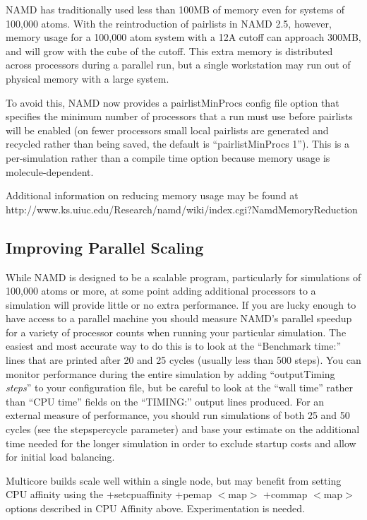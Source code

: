 NAMD has traditionally used less than 100MB of memory even for systems
of 100,000 atoms.  With the reintroduction of pairlists in NAMD 2.5,
however, memory usage for a 100,000 atom system with a 12A cutoff can
approach 300MB, and will grow with the cube of the cutoff.  This extra
memory is distributed across processors during a parallel run, but a
single workstation may run out of physical memory with a large system.

To avoid this, NAMD now provides a pairlistMinProcs config file option
that specifies the minimum number of processors that a run must use
before pairlists will be enabled (on fewer processors small local
pairlists are generated and recycled rather than being saved, the
default is ``pairlistMinProcs 1'').  This is a per-simulation rather than
a compile time option because memory usage is molecule-dependent.

Additional information on reducing memory usage may be found at
http://www.ks.uiuc.edu/Research/namd/wiki/index.cgi?NamdMemoryReduction

\subsection{Improving Parallel Scaling}

While NAMD is designed to be a scalable program, particularly for
simulations of 100,000 atoms or more, at some point adding additional
processors to a simulation will provide little or no extra performance.
If you are lucky enough to have access to a parallel machine you should
measure NAMD's parallel speedup for a variety of processor counts when
running your particular simulation.  The easiest and most accurate way
to do this is to look at the ``Benchmark time:'' lines that are printed
after 20 and 25 cycles (usually less than 500 steps).  You can monitor
performance during the entire simulation by adding ``outputTiming {\em steps}''
to your configuration file, but be careful to look at the ``wall time''
rather than ``CPU time'' fields on the ``TIMING:'' output lines produced.
For an external measure of performance, you should run simulations of
both 25 and 50 cycles (see the stepspercycle parameter) and base your
estimate on the additional time needed for the longer simulation in
order to exclude startup costs and allow for initial load balancing.

Multicore builds scale well within a single node, but may benefit from
setting CPU affinity using the +setcpuaffinity +pemap $<$map$>$ +commap $<$map$>$
options described in CPU Affinity above.  Experimentation is needed.

